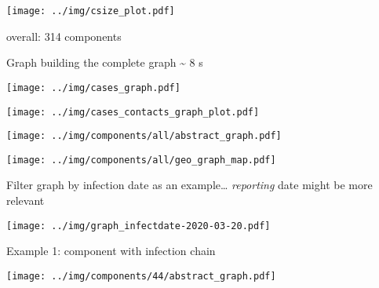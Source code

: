 \documentclass[
  8pt,
  ignorenonframetext,
]{beamer}
\begin{document}
\begin{frame}
\begin{center}
\texttt{[image: ../img/csize\_plot.pdf]}
\end{center}

\tiny

overall: 314 components \normalsize
\end{frame}

\begin{frame}{Graph}
\protect\hypertarget{graph}{}
building the complete graph \textasciitilde{} 8 s

\begin{center}
\texttt{[image: ../img/cases\_graph.pdf]}
\end{center}
\end{frame}

\begin{frame}
\begin{center}
\texttt{[image: ../img/cases\_contacts\_graph\_plot.pdf]}
\end{center}
\end{frame}

\begin{frame}
\begin{center}
\texttt{[image: ../img/components/all/abstract\_graph.pdf]}
\end{center}
\end{frame}

\begin{frame}
\begin{center}
\texttt{[image: ../img/components/all/geo\_graph\_map.pdf]}
\end{center}
\end{frame}

\begin{frame}{Filter graph by infection date}
\protect\hypertarget{filter-graph-by-infection-date}{}
as an example\ldots{} \emph{reporting} date might be more relevant

\begin{center}
\texttt{[image: ../img/graph\_infectdate-2020-03-20.pdf]}
\end{center}
\end{frame}

\begin{frame}{Example 1: component with infection chain}
\protect\hypertarget{example-1-component-with-infection-chain}{}
\begin{center}
\texttt{[image: ../img/components/44/abstract\_graph.pdf]}
\end{center}
\end{frame}
\end{document}
